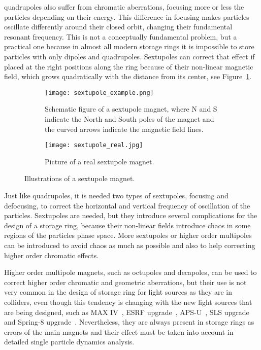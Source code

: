 \begin{description}[align=left]
        \item[Sextupoles:] quadrupoles also suffer from chromatic aberrations, focusing more or less the particles depending on their energy. This difference in focusing makes particles oscillate differently around their closed orbit, changing their fundamental resonant frequency. This is not a conceptually fundamental problem, but a practical one because in almost all modern storage rings it is impossible to store particles with only dipoles and quadrupoles. Sextupoles can correct that effect if placed at the right positions along the ring because of their non-linear magnetic field, which grows quadratically with the distance from its center, see Figure~\ref{fig:sextupole}.
        \begin{figure}
            \centering
            \begin{subfigure}[c]{0.47\textwidth}
                \centering
                \texttt{[image: sextupole\_example.png]}
                \caption{Schematic figure of a sextupole magnet, where N and S indicate the North and South poles of the magnet and the curved arrows indicate the magnetic field lines.}
            \end{subfigure}\hfill
            \begin{subfigure}[c]{0.5\textwidth}
                \texttt{[image: sextupole\_real.jpg]}
                \caption{Picture of a real sextupole magnet.}
            \end{subfigure}
            \caption{Illustrations of a sextupole magnet.}
            \label{fig:sextupole}
        \end{figure}
        Just like quadrupoles, it is needed two types of sextupoles, focusing and defocusing, to correct the horizontal and vertical frequency of oscillation of the particles. Sextupoles are needed, but they introduce several complications for the design of a storage ring, because their non-linear fields introduce chaos in some regions of the particles phase space. More sextupoles or higher order multipoles can be introduced to avoid chaos as much as possible and also to help correcting higher order chromatic effects.
    \end{description}

    Higher order multipole magnets, such as octupoles and decapoles, can be used to correct higher order chromatic and geometric aberrations, but their use is not very common in the design of storage ring for light sources as they are in colliders, even though this tendency is changing with the new light sources that are being designed, such as MAX IV~\cite{Leemann2009}, ESRF upgrade~\cite{Farvacque2013}, APS-U~\cite{Sun2015}, SLS upgrade~\cite{Streun2015} and Spring-8 upgrade~\cite{Soutome2016}. Nevertheless, they are always present in storage rings as errors of the main magnets and their effect must be taken into account in detailed single particle dynamics analysis.

